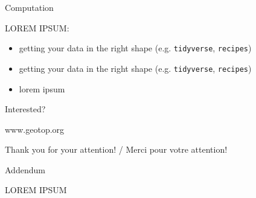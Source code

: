 \documentclass[ignorenonframetext,]{beamer}
\begin{document}
\begin{frame}[fragile]{Computation}

LOREM IPSUM:

\begin{itemize}
\item
  getting your data in the right shape (e.g. \texttt{tidyverse},
  \texttt{recipes})
\item
  getting your data in the right shape (e.g. \texttt{tidyverse},
  \texttt{recipes})
\item
  lorem ipsum
\end{itemize}

\end{frame}

\begin{frame}{Interested?}

www.geotop.org

Thank you for your attention! / Merci pour votre attention!

\end{frame}

\begin{frame}{Addendum}

LOREM IPSUM

\end{frame}
\end{document}
